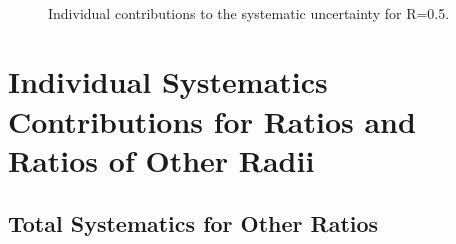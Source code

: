 \begin{figure}[h!]
    \qquad
    \\
    \qquad
    \caption{Individual contributions to the systematic uncertainty for R=0.5.}
    \label{fig:IndividualSysR05}
\end{figure}

\newpage

\section{Individual Systematics Contributions for Ratios and Ratios of Other Radii}
\label{sec:AppendixSystematicsRatios}

\subsection{Total Systematics for Other Ratios}
\label{subsec:appendixTotalSystematicsRatios}

